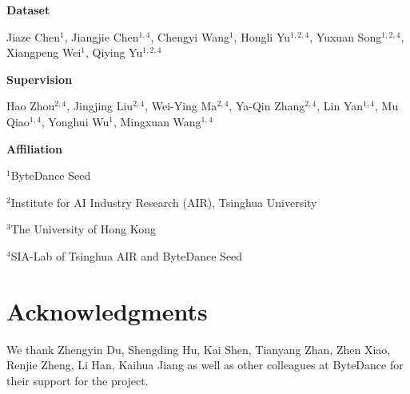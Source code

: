 \textbf{Dataset}

Jiaze Chen$^{1}$, Jiangjie Chen$^{1,4}$, Chengyi Wang$^{1}$, Hongli Yu$^{1,2,4}$, Yuxuan Song$^{1,2,4}$, Xiangpeng Wei$^{1}$, Qiying Yu$^{1,2,4}$


\textbf{Supervision}

Hao Zhou$^{2,4}$, Jingjing Liu$^{2,4}$, Wei-Ying Ma$^{2,4}$, Ya-Qin Zhang$^{2,4}$, Lin Yan$^{1,4}$, Mu Qiao$^{1,4}$, Yonghui Wu$^{1}$, Mingxuan Wang$^{1,4}$


\textbf{Affiliation}





$^1$ByteDance Seed

$^2$Institute for AI Industry Research (AIR), Tsinghua University

$^3$The University of Hong Kong

$^4$SIA-Lab of Tsinghua AIR and ByteDance Seed

\section*{Acknowledgments}

We thank Zhengyin Du, Shengding Hu, Kai Shen, Tianyang Zhan, Zhen Xiao, Renjie Zheng, Li Han, Kaihua Jiang as well as other colleagues at ByteDance for their support for the \method project.